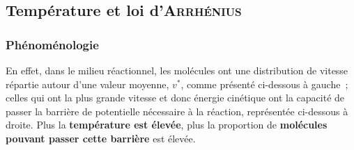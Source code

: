 \documentclass[../../main/main.tex]{subfiles}
\begin{document}
\subsection{Température et loi d'\textsc{Arrhénius}}
\subsubsection{Phénoménologie}

En effet, dans le milieu réactionnel, les molécules ont une distribution de
vitesse répartie autour d'une valeur moyenne, $v^*$, comme présenté ci-dessous à
gauche~; celles qui ont la plus grande vitesse et donc énergie cinétique ont la
capacité de passer la barrière de potentielle nécessaire à la réaction,
représentée ci-dessous à droite. Plus la \textbf{température est élevée}, plus la
proportion de \textbf{molécules pouvant passer cette barrière} est élevée.

\begin{minipage}{0.49\linewidth}
\end{minipage}
\hfill
\begin{minipage}{0.49\linewidth}
\end{minipage}
\end{document}
